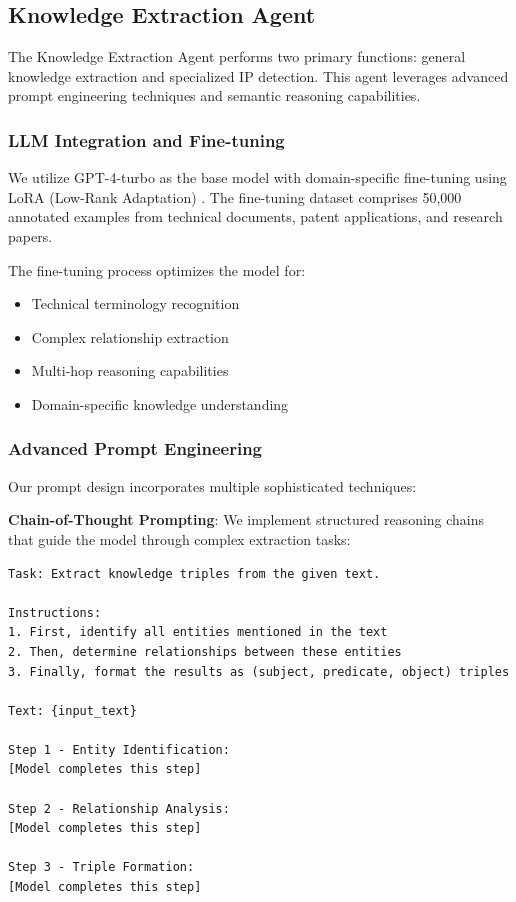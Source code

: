 \documentclass[11pt,a4paper]{article}
\begin{document}
\subsection{Knowledge Extraction Agent}

The Knowledge Extraction Agent performs two primary functions: general knowledge extraction and specialized IP detection. This agent leverages advanced prompt engineering techniques and semantic reasoning capabilities.

\subsubsection{LLM Integration and Fine-tuning}

We utilize GPT-4-turbo as the base model with domain-specific fine-tuning using LoRA (Low-Rank Adaptation) \citep{hu2021lora}. The fine-tuning dataset comprises 50,000 annotated examples from technical documents, patent applications, and research papers.

The fine-tuning process optimizes the model for:
\begin{itemize}
  \item Technical terminology recognition
  \item Complex relationship extraction
  \item Multi-hop reasoning capabilities
  \item Domain-specific knowledge understanding
\end{itemize}

\subsubsection{Advanced Prompt Engineering}

Our prompt design incorporates multiple sophisticated techniques:

\textbf{Chain-of-Thought Prompting}: We implement structured reasoning chains that guide the model through complex extraction tasks:

\begin{lstlisting}[caption=Chain-of-Thought Prompt Template]
Task: Extract knowledge triples from the given text.

Instructions:
1. First, identify all entities mentioned in the text
2. Then, determine relationships between these entities  
3. Finally, format the results as (subject, predicate, object) triples

Text: {input_text}

Step 1 - Entity Identification:
[Model completes this step]

Step 2 - Relationship Analysis:
[Model completes this step]

Step 3 - Triple Formation:
[Model completes this step]
\end{lstlisting}
\end{document}
